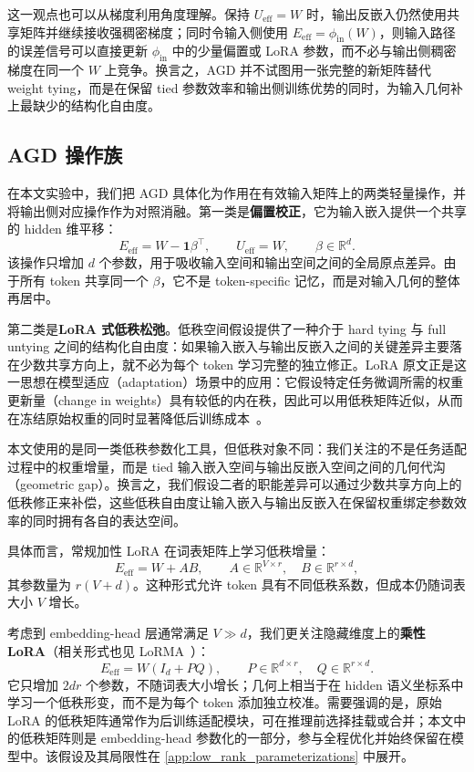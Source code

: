 \documentclass{article}
\theoremstyle{plain}
\theoremstyle{definition}
\theoremstyle{remark}
\begin{document}
这一观点也可以从梯度利用角度理解。保持 $U_{\mathrm{eff}}=W$ 时，输出反嵌入仍然使用共享矩阵并继续接收强稠密梯度；同时令输入侧使用 $E_{\mathrm{eff}}=\phi_{\mathrm{in}}(W)$，则输入路径的误差信号可以直接更新 $\phi_{\mathrm{in}}$ 中的少量偏置或 LoRA 参数，而不必与输出侧稠密梯度在同一个 $W$ 上竞争。换言之，AGD 并不试图用一张完整的新矩阵替代 weight tying，而是在保留 tied 参数效率和输出侧训练优势的同时，为输入几何补上最缺少的结构化自由度。

\subsection{AGD 操作族}
\label{sec:proposed_arch}

在本文实验中，我们把 AGD 具体化为作用在有效输入矩阵上的两类轻量操作，并将输出侧对应操作作为对照消融。第一类是\textbf{偏置校正}，它为输入嵌入提供一个共享的 hidden 维平移：
\begin{equation}
    E_{\mathrm{eff}} = W - \mathbf{1}\beta^\top,\qquad U_{\mathrm{eff}}=W,\qquad \beta\in\mathbb{R}^{d}.
\end{equation}
该操作只增加 $d$ 个参数，用于吸收输入空间和输出空间之间的全局原点差异。由于所有 token 共享同一个 $\beta$，它不是 token-specific 记忆，而是对输入几何的整体再居中。

第二类是\textbf{LoRA 式低秩松弛}。低秩空间假设提供了一种介于 hard tying 与 full untying 之间的结构化自由度：如果输入嵌入与输出反嵌入之间的关键差异主要落在少数共享方向上，就不必为每个 token 学习完整的独立修正。LoRA 原文正是这一思想在模型适应（adaptation）场景中的应用：它假设特定任务微调所需的权重更新量（change in weights）具有较低的内在秩，因此可以用低秩矩阵近似，从而在冻结原始权重的同时显著降低后训练成本~\cite{hu2022lora}。

本文使用的是同一类低秩参数化工具，但低秩对象不同：我们关注的不是任务适配过程中的权重增量，而是 tied 输入嵌入空间与输出反嵌入空间之间的几何代沟（geometric gap）。换言之，我们假设二者的职能差异可以通过少数共享方向上的低秩修正来补偿，这些低秩自由度让输入嵌入与输出反嵌入在保留权重绑定参数效率的同时拥有各自的表达空间。

具体而言，常规加性 LoRA 在词表矩阵上学习低秩增量：
\begin{equation}
    E_{\mathrm{eff}} = W + AB,\qquad
    A\in\mathbb{R}^{V\times r},\quad B\in\mathbb{R}^{r\times d},
\end{equation}
其参数量为 $r(V+d)$。这种形式允许 token 具有不同低秩系数，但成本仍随词表大小 $V$ 增长。

考虑到 embedding-head 层通常满足 $V\gg d$，我们更关注隐藏维度上的\textbf{乘性 LoRA}（相关形式也见 LoRMA~\cite{bihany2025lorma}）：
\begin{equation}
    E_{\mathrm{eff}} = W(I_d+PQ),\qquad
    P\in\mathbb{R}^{d\times r},\quad Q\in\mathbb{R}^{r\times d}.
\end{equation}
它只增加 $2dr$ 个参数，不随词表大小增长；几何上相当于在 hidden 语义坐标系中学习一个低秩形变，而不是为每个 token 添加独立校准。需要强调的是，原始 LoRA 的低秩矩阵通常作为后训练适配模块，可在推理前选择挂载或合并；本文中的低秩矩阵则是 embedding-head 参数化的一部分，参与全程优化并始终保留在模型中。该假设及其局限性在 \cref{app:low_rank_parameterizations} 中展开。
\end{document}
